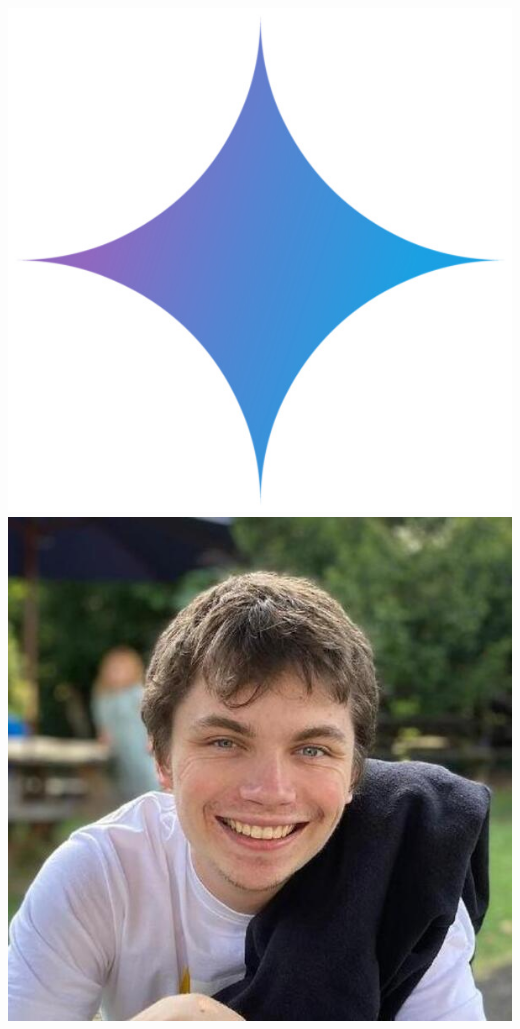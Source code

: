 \documentclass[aspectratio=169]{beamer}
\begin{document}
\begin{frame}
{        \includegraphics[width=0.06\textheight]{people/gemini.jpg}%
        \includegraphics[width=0.06\textheight]{people/harry_bevins.jpg}%
}
\end{frame}
\end{document}
